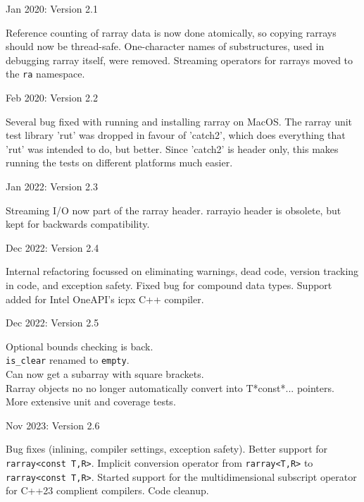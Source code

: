 \documentclass[11pt,twoside]{article}
\begin{document}
\noindent
Jan 2020: Version 2.1

Reference counting of rarray data is now done atomically, so copying
rarrays should now be thread-safe.  One-character names of
substructures, used in debugging rarray itself, were
removed. Streaming operators for rarrays moved to the \texttt{ra}
namespace.

\noindent
Feb 2020: Version 2.2

Several bug fixed with running and installing rarray on MacOS.  The
rarray unit test library 'rut' was dropped in favour of 'catch2',
which does everything that 'rut' was intended to do, but better. Since
'catch2' is header only, this makes running the tests on different
platforms much easier.

\noindent
Jan 2022: Version 2.3

Streaming I/O now part of the rarray header. rarrayio header is
obsolete, but kept for backwards compatibility. 

\noindent
Dec 2022: Version 2.4

Internal refactoring focussed on eliminating warnings, dead code,
version tracking in code, and exception safety.
Fixed bug for compound data types.
Support added for Intel OneAPI's icpx C++ compiler.

\noindent
Dec 2022: Version 2.5

Optional bounds checking is back.\\
\texttt{is\_clear} renamed to \texttt{empty}.\\
Can now get a subarray with square brackets.\\
Rarray objects no no longer automatically convert into T*const*... pointers.\\
More extensive unit and coverage tests.

\noindent
Nov 2023: Version 2.6

Bug fixes (inlining, compiler settings, exception safety).  Better
support for \texttt{rarray<const T,R>}.  Implicit conversion operator
from \texttt{rarray<T,R>} to \texttt{rarray<const T,R>}.  Started
support for the multidimensional subscript operator for C++23 complient compilers.
Code cleanup.
\end{document}
